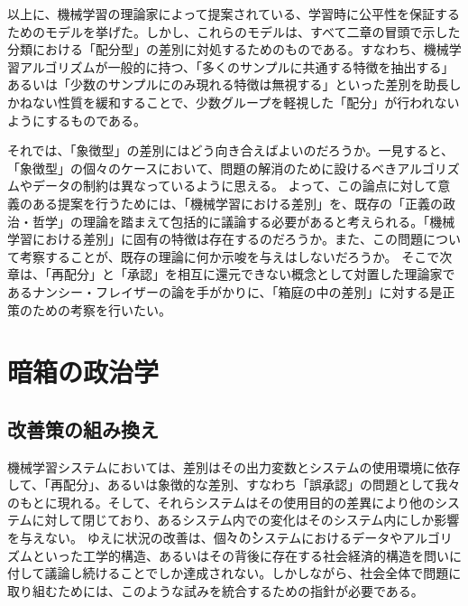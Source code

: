 \documentclass[b5j,twoside,twocolumn]{utarticle}
\newcommand{\mysection}[1]{\vspace{-5mm}\section{#1}\vspace{-2mm}}
\begin{document}
以上に、機械学習の理論家によって提案されている、学習時に公平性を保証するためのモデルを挙げた。しかし、これらのモデルは、すべて二章の冒頭で示した分類における「配分型」の差別に対処するためのものである。すなわち、機械学習アルゴリズムが一般的に持つ、「多くのサンプルに共通する特徴を抽出する」あるいは「少数のサンプルにのみ現れる特徴は無視する」といった差別を助長しかねない性質を緩和することで、少数グループを軽視した「配分」が行われないようにするものである。


それでは、「象徴型」の差別にはどう向き合えばよいのだろうか。一見すると、「象徴型」の個々のケースにおいて、問題の解消のために設けるべきアルゴリズムやデータの制約は異なっているように思える。
よって、この論点に対して意義のある提案を行うためには、「機械学習における差別」を、既存の「正義の政治・哲学」の理論を踏まえて包括的に議論する必要があると考えられる。「機械学習における差別」に固有の特徴は存在するのだろうか。また、この問題について考察することが、既存の理論に何か示唆を与えはしないだろうか。
そこで次章は、「再配分」と「承認」を相互に還元できない概念として対置した理論家であるナンシー・フレイザーの論を手がかりに、「箱庭の中の差別」に対する是正策のための考察を行いたい。

\mysection{暗箱の政治学}
\subsection{改善策の組み換え}


機械学習システムにおいては、差別はその出力変数とシステムの使用環境に依存して、「再配分」、あるいは象徴的な差別、すなわち「誤承認」の問題として我々のもとに現れる。そして、それらシステムはその使用目的の差異により他のシステムに対して閉じており、あるシステム内での変化はそのシステム内にしか影響を与えない。
ゆえに状況の改善は、\.個\.々\.のシステムにおけるデータやアルゴリズムといった工学的構造、あるいはその背後に存在する社会経済的構造を問いに付して議論し続けることでしか達成されない。しかしながら、社会全体で問題に取り組むためには、このような試みを統合するための指針が必要である。
\end{document}
